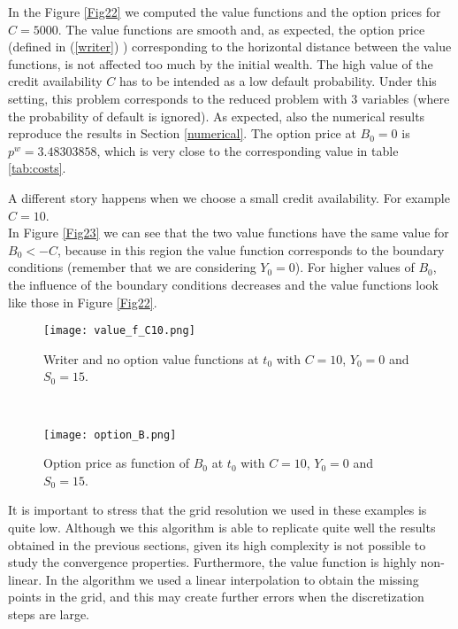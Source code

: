 In the Figure \ref{Fig22} we computed the value functions and the option prices for $C= 5000$.
The value functions are smooth and, as expected, the option price (defined in (\ref{writer}) ) corresponding to the horizontal distance between the value functions,
is not affected too much by the initial wealth. 
The high value of the credit availability $C$ 
has to be intended as a low default probability. 
Under this setting, this problem corresponds to the reduced problem with 3 variables (where the probability of default is ignored). 
As expected, also the numerical results reproduce the results in Section \ref{numerical}. 
The option price at $B_0=0$ is $p^w=3.48303858$, which is very close to the corresponding value in table \ref{tab:costs}.

A different story happens when we choose a small credit availability. For example $C = 10$.\\ 
In Figure \ref{Fig23} we can see that the two value functions have the same value for $B_0 < -C$, because in this region the value function corresponds to the boundary conditions
(remember that we are considering $Y_0=0$). 
For higher values of $B_0$, the influence of the boundary conditions decreases and the value functions look like those in Figure \ref{Fig22}.
\begin{figure}[t!]
 \begin{minipage}[b]{0.5\linewidth}
   \centering
   \texttt{[image: value\_f\_C10.png]}
   \caption{Writer and no option value functions at $t_0$ with $C=10$, $Y_0=0$ and $S_0=15$.}
   \label{Fig23} 
 \end{minipage}
 \ \hspace{2mm} \hspace{3mm} \
 \begin{minipage}[b]{0.5\linewidth}
   \texttt{[image: option\_B.png]}
   \caption{Option price as function of $B_0$ at $t_0$ with $C=10$, $Y_0=0$ and $S_0=15$.}
   \label{Fig24}
 \end{minipage}
\end{figure}  

It is important to stress that the grid resolution we used in these examples is quite low. 
Although we this algorithm is able to replicate quite well the results obtained in the previous sections,  
given its high complexity is not possible to study the convergence properties. 
Furthermore, the value function is highly non-linear. In the algorithm we used a linear interpolation to obtain the missing points in the grid, 
and this may create further errors when the discretization steps are large.

